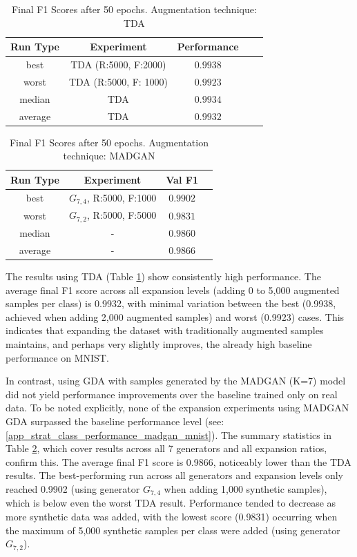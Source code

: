 \begin{table}[H]
	\centering
	\vspace{-1.5em}
	\begin{tabular}{|c|c|c|c|c|}
		\hline
		Run Type & Experiment & Performance \\ \hline
		best & TDA (R:5000, F:2000) & $0.9938$\\ \hline
		worst & TDA (R:5000, F: 1000) & $0.9923$\\ \hline
		median & TDA & $0.9934$\\ \hline
		average & TDA & $0.9932$
		\\ \hline
	\end{tabular}
    \caption{Final F1 Scores after 50 epochs. Augmentation technique: TDA}
        \label{tab:res_expansion_mnist_tda_vs_madgan__tda}
\end{table}
\begin{table}[H]
	\vspace{-1.5em}
	\centering
	\begin{tabular}{|c|c|c|c|}
		\hline
		Run Type & Experiment & Val F1 \\ \hline
		best & \(G_{7, 4}\), R:5000, F:1000 & $0.9902$\\ \hline
		worst & \(G_{7, 2}\), R:5000, F:5000 & $0.9831$\\ \hline
		median & - & $0.9860$\\ \hline
		average & - & $0.9866$
		\\ \hline
	\end{tabular}
    \caption{Final F1 Scores after 50 epochs. Augmentation technique: MADGAN}
        \label{tab:res_expansion_mnist_tda_vs_madgan__madgan}
\end{table}

The results using TDA (Table \ref{tab:res_expansion_mnist_tda_vs_madgan__tda}) show consistently high performance. The average final F1 score across all expansion levels (adding 0 to 5,000 augmented samples per class) is 0.9932, with minimal variation between the best (0.9938, achieved when adding 2,000 augmented samples) and worst (0.9923) cases. This indicates that expanding the dataset with traditionally augmented samples maintains, and perhaps very slightly improves, the already high baseline performance on MNIST.

In contrast, using GDA with samples generated by the MADGAN (K=7) model did not yield performance improvements over the baseline trained only on real data. To be noted explicitly, none of the expansion experiments using MADGAN GDA surpassed the baseline performance level (see: \ref{app_strat_class_performance_madgan_mnist}). The summary statistics in Table \ref{tab:res_expansion_mnist_tda_vs_madgan__madgan}, which cover results across all 7 generators and all expansion ratios, confirm this. The average final F1 score is 0.9866, noticeably lower than the TDA results. The best-performing run across all generators and expansion levels only reached 0.9902 (using generator \(G_{7,4}\) when adding 1,000 synthetic samples), which is below even the worst TDA result. Performance tended to decrease as more synthetic data was added, with the lowest score (0.9831) occurring when the maximum of 5,000 synthetic samples per class were added (using generator \(G_{7,2}\)).

